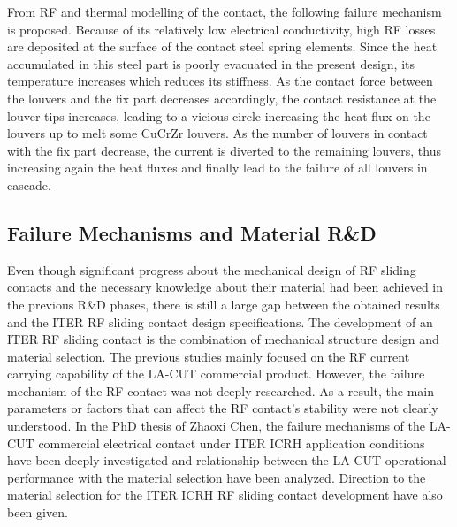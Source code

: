 {From RF and thermal modelling of the contact, the following failure mechanism is proposed. Because of its relatively low electrical conductivity, high RF losses are deposited at the surface of the contact steel spring elements. Since the heat accumulated in this steel part is poorly evacuated in the present design, its temperature increases which reduces its stiffness. As the contact force between the louvers and the fix part decreases accordingly, the contact resistance at the louver tips increases, leading to a vicious circle increasing the heat flux on the louvers up to melt some CuCrZr louvers. As the number of louvers in contact with the fix part decrease, the current is diverted to the remaining louvers, thus increasing again the heat fluxes and finally lead to the failure of all louvers in cascade. 



\subsection{Failure Mechanisms and Material R\&D}
Even though significant progress about the mechanical design of RF sliding contacts and the necessary knowledge about their material had been achieved in the previous R\&D phases, there is still a large gap between the obtained results and the ITER RF sliding contact design specifications. The development of an ITER RF sliding contact is the combination of mechanical structure design and material selection. The previous studies mainly focused on the RF current carrying capability of the LA-CUT commercial product. However, the failure mechanism of the RF contact was not deeply researched. As a result, the main parameters or factors that can affect the RF contact's stability were not clearly understood. In the PhD thesis of Zhaoxi Chen, the failure mechanisms of the LA-CUT commercial electrical contact under ITER ICRH application conditions have been deeply investigated and relationship between the LA-CUT operational performance with the material selection have been analyzed. Direction to the material selection for the ITER ICRH RF sliding contact development have also been given. 

}
